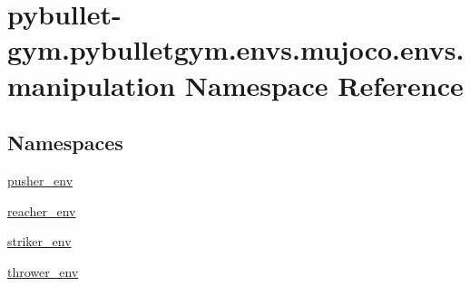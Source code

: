 \hypertarget{namespacepybullet-gym_1_1pybulletgym_1_1envs_1_1mujoco_1_1envs_1_1manipulation}{}\section{pybullet-\/gym.pybulletgym.\+envs.\+mujoco.\+envs.\+manipulation Namespace Reference}
\label{namespacepybullet-gym_1_1pybulletgym_1_1envs_1_1mujoco_1_1envs_1_1manipulation}
\subsection*{Namespaces}
\begin{DoxyCompactItemize}
\item 
 \hyperlink{namespacepybullet-gym_1_1pybulletgym_1_1envs_1_1mujoco_1_1envs_1_1manipulation_1_1pusher__env}{pusher\+\_\+env}
\item 
 \hyperlink{namespacepybullet-gym_1_1pybulletgym_1_1envs_1_1mujoco_1_1envs_1_1manipulation_1_1reacher__env}{reacher\+\_\+env}
\item 
 \hyperlink{namespacepybullet-gym_1_1pybulletgym_1_1envs_1_1mujoco_1_1envs_1_1manipulation_1_1striker__env}{striker\+\_\+env}
\item 
 \hyperlink{namespacepybullet-gym_1_1pybulletgym_1_1envs_1_1mujoco_1_1envs_1_1manipulation_1_1thrower__env}{thrower\+\_\+env}
\end{DoxyCompactItemize}
